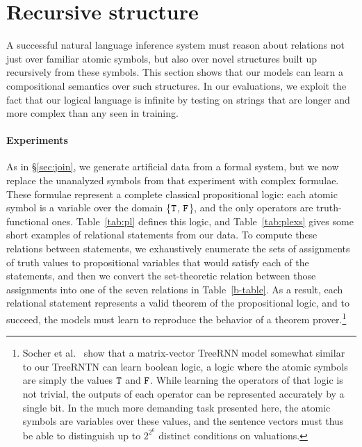 \section{Recursive structure}\label{sec:recursion}

A successful natural language inference system must reason 
about relations not just over familiar
atomic symbols, but also over novel structures built up 
recursively from these symbols. 
This section shows that our models can learn a 
compositional semantics over such structures.
In our evaluations, we exploit the fact that our logical language
is infinite by testing on strings that are longer and more complex
than any seen in training.


\paragraph{Experiments}
As in \S\ref{sec:join}, we generate artificial data from a formal system,
 but we now replace the unanalyzed symbols
from that experiment with complex formulae. These formulae
represent a complete classical propositional logic:
each atomic symbol is a variable over the domain \{$\texttt{T}$, $\texttt{F}$\}, and the only
operators are truth-functional ones.  Table~\ref{tab:pl} defines this
logic, and Table~\ref{tab:plexs} gives some short examples of relational statements from our data.
 To compute these relations
between statements, we exhaustively enumerate the sets of assignments
of truth values to propositional variables that would satisfy each of
the statements, and then we convert the set-theoretic relation between
those assignments into one of the seven relations in
Table~\ref{b-table}. As a result, each relational statement represents
a valid theorem of the propositional logic, and to succeed, the models 
must learn to reproduce the behavior of a theorem prover.\footnote{
Socher et al.~ show that a matrix-vector TreeRNN
model somewhat similar to our TreeRNTN can learn boolean logic, 
a logic where the atomic symbols are simply the
values $\texttt{T}$ and $\texttt{F}$. While learning the operators of that logic is not trivial, the outputs of
each operator can be represented accurately by a single bit.
In the much more demanding task presented here, the atomic symbols are variables over these values, and the sentence vectors must thus be able to distinguish up to {\tiny $2^{2^{6}}$} distinct conditions on valuations.}

